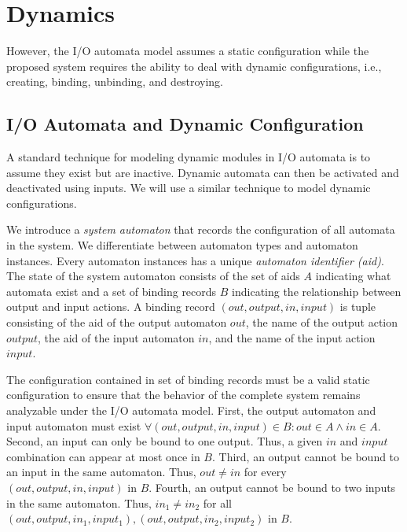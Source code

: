 \section{Dynamics\label{dynamics}}



However, the I/O automata model assumes a static configuration while the proposed system requires the ability to deal with dynamic configurations, i.e., creating, binding, unbinding, and destroying.

\subsection{I/O Automata and Dynamic Configuration}

A standard technique for modeling dynamic modules in I/O automata is to assume they exist but are inactive.
Dynamic automata can then be activated and deactivated using inputs.
We will use a similar technique to model dynamic configurations.

We introduce a \emph{system automaton} that records the configuration of all automata in the system.
We differentiate between automaton types and automaton instances.
Every automaton instances has a unique \emph{automaton identifier (aid)}.
The state of the system automaton consists of the set of aids $A$ indicating what automata exist and a set of binding records $B$ indicating the relationship between output and input actions.
A binding record $(out, output, in, input)$ is tuple consisting of the aid of the output automaton $out$, the name of the output action $output$, the aid of the input automaton $in$, and the name of the input action $input$.

The configuration contained in set of binding records must be a valid static configuration to ensure that the behavior of the complete system remains analyzable under the I/O automata model.
First, the output automaton and input automaton must exist $\forall (out, output, in, input) \in B: out \in A \land in \in A$.
Second, an input can only be bound to one output.
Thus, a given $in$ and $input$ combination can appear at most once in $B$.
Third, an output cannot be bound to an input in the same automaton.
Thus, $out \neq in$ for every $(out, output, in, input)$ in $B$.
Fourth, an output cannot be bound to two inputs in the same automaton.
Thus, $in_1 \neq in_2$ for all $(out, output, in_1, input_1), (out, output, in_2, input_2)$ in $B$.

